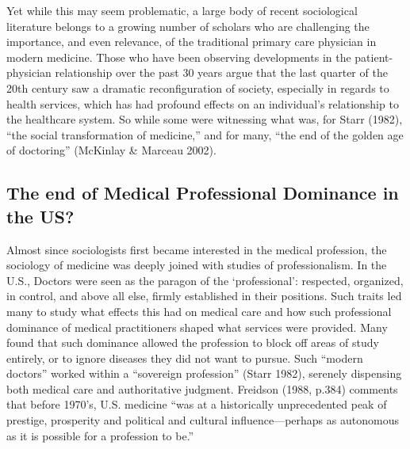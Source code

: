 \documentclass[12pt,twoside]{reedthesis}
\begin{document}
  Yet while this may seem problematic, a large body of recent sociological
  literature belongs to a growing number of scholars who are challenging
  the importance, and even relevance, of the traditional primary care
  physician in modern medicine. Those who have been observing developments
  in the patient-physician relationship over the past 30 years argue that
  the last quarter of the 20th century saw a dramatic reconfiguration of
  society, especially in regards to health services, which has had
  profound effects on an individual's relationship to the healthcare
  system. So while some were witnessing what was, for Starr (1982), ``the
  social transformation of medicine,'' and for many, ``the end of the
  golden age of doctoring'' (McKinlay \& Marceau 2002).
  
  \subsection{The end of Medical Professional Dominance in the
  US?}\label{the-end-of-medical-professional-dominance-in-the-us}
  
  Almost since sociologists first became interested in the medical
  profession, the sociology of medicine was deeply joined with studies of
  professionalism. In the U.S., Doctors were seen as the paragon of the
  `professional': respected, organized, in control, and above all else,
  firmly established in their positions. Such traits led many to study
  what effects this had on medical care and how such professional
  dominance of medical practitioners shaped what services were provided.
  Many found that such dominance allowed the profession to block off areas
  of study entirely, or to ignore diseases they did not want to pursue.
  Such ``modern doctors'' worked within a ``sovereign profession'' (Starr
  1982), serenely dispensing both medical care and authoritative judgment.
  Freidson (1988, p.384) comments that before 1970's, U.S. medicine ``was
  at a historically unprecedented peak of prestige, prosperity and
  political and cultural influence---perhaps as autonomous as it is
  possible for a profession to be.''
  
\end{document}
